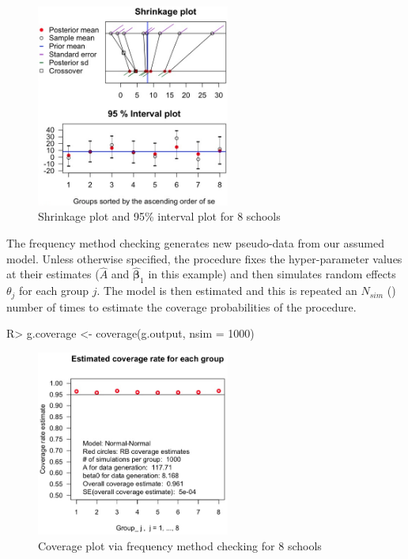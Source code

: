 \documentclass[article]{jss}
\begin{document}
\begin{figure}[h] 
\begin{center}
\includegraphics[width = 2.5in]{school1.png}
\caption{Shrinkage plot and 95\% interval plot for 8 schools}
\label{fig:8schoolsplot}
\end{center}
\end{figure}


The frequency method checking generates new pseudo-data from our assumed model. Unless otherwise specified, the procedure fixes the hyper-parameter values at their estimates ($\hat{A}$ and $\hat{\boldsymbol{\beta}}_1$ in this example) and then simulates random effects $\theta_j$ for each group $j$. The model is then estimated and this is repeated an $N_{sim}$ () number of times to estimate the coverage probabilities of the procedure.  

\begin{CodeChunk}
\begin{CodeInput}
R> g.coverage <- coverage(g.output, nsim = 1000)
\end{CodeInput}
\end{CodeChunk}
\begin{figure}[h] 
\begin{center}
\includegraphics[width = 2.5in]{school2.png}
\caption{Coverage plot via frequency method checking for 8 schools}
\label{fig:schoolcoverage}
\end{center}
\end{figure}
\end{document}
